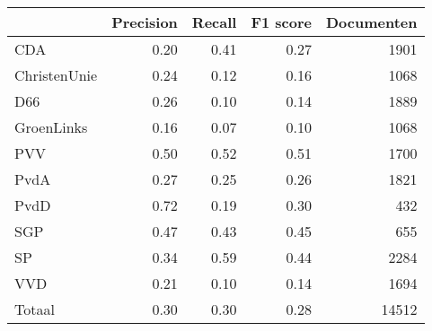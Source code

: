\begin{tabular}{lrrrr}
\toprule
{} &  Precision &  Recall &  F1 score &  Documenten \\
\midrule
CDA          &       0.20 &    0.41 &      0.27 &        1901 \\
ChristenUnie &       0.24 &    0.12 &      0.16 &        1068 \\
D66          &       0.26 &    0.10 &      0.14 &        1889 \\
GroenLinks   &       0.16 &    0.07 &      0.10 &        1068 \\
PVV          &       0.50 &    0.52 &      0.51 &        1700 \\
PvdA         &       0.27 &    0.25 &      0.26 &        1821 \\
PvdD         &       0.72 &    0.19 &      0.30 &         432 \\
SGP          &       0.47 &    0.43 &      0.45 &         655 \\
SP           &       0.34 &    0.59 &      0.44 &        2284 \\
VVD          &       0.21 &    0.10 &      0.14 &        1694 \\
Totaal       &       0.30 &    0.30 &      0.28 &       14512 \\
\bottomrule
\end{tabular}
